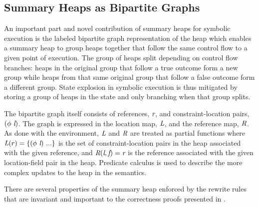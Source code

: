 \subsection{Summary Heaps as Bipartite Graphs}
An important part and novel contribution of summary heaps for symbolic
execution is the labeled bipartite graph representation of the heap
which enables a summary heap to group heaps together that follow the
same control flow to a given point of execution. The group of heaps
split depending on control flow branches: heaps in the original group
that follow a true outcome form a new group while heaps from that same
original group that follow a false outcome form a different
group. State explosion in symbolic execution is thus mitigated by
storing a group of heaps in the state and only branching when that
group splits.

The bipartite graph itself consists of references, $\emph{r}$, and
constraint-location pairs, $(\phi\ \emph{l})$. The graph is
expressed in the location map, $\emph{L}$, and the reference map,
$\emph{R}$. As done with the environment, $\emph{L}$ and $\emph{R}$
are treated as partial functions where $\emph{L}(r) =
\{(\phi\ \emph{l})\ ...\}$ is the set of constraint-location pairs in
the heap associated with the given reference, and
$\emph{R}(\emph{l},\emph{f}) = \emph{r}$ is the reference
associated with the given location-field pair in the heap. Predicate
calculus is used to describe the more complex updates to the heap in
the semantics.

There are several properties of the summary heap 
enforced by the rewrite rules that are invariant and
important to the correctness proofs
presented in .


